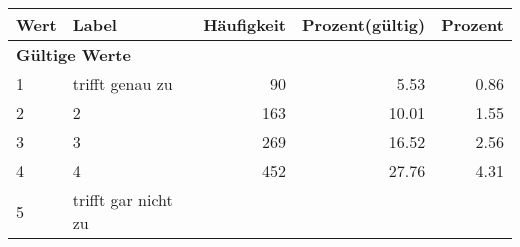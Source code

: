      \begin{longtable}{lXrrr}
     \toprule
     \textbf{Wert} & \textbf{Label} & \textbf{Häufigkeit} & \textbf{Prozent(gültig)} & \textbf{Prozent} \\
     \endhead
     \midrule
     \multicolumn{5}{l}{\textbf{Gültige Werte}}\\

     1 &
     \multicolumn{1}{X}{ trifft genau zu   } &


       \num{90} &
       \num[round-mode=places,round-precision=2]{5,53} &
         \num[round-mode=places,round-precision=2]{0,86} \\

     2 &
     \multicolumn{1}{X}{ 2   } &


       \num{163} &
       \num[round-mode=places,round-precision=2]{10,01} &
         \num[round-mode=places,round-precision=2]{1,55} \\

     3 &
     \multicolumn{1}{X}{ 3   } &


       \num{269} &
       \num[round-mode=places,round-precision=2]{16,52} &
         \num[round-mode=places,round-precision=2]{2,56} \\

     4 &
     \multicolumn{1}{X}{ 4   } &


       \num{452} &
       \num[round-mode=places,round-precision=2]{27,76} &
         \num[round-mode=places,round-precision=2]{4,31} \\

     5 &
     \multicolumn{1}{X}{ trifft gar nicht zu   } &



\end{longtable}
